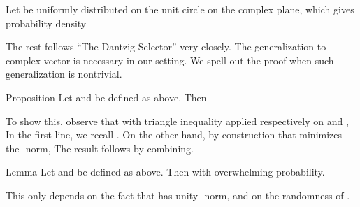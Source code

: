 \stopsection

\startsection [title={Design of \m {\M{F}_R}}]

Let  be uniformly distributed on the unit circle on the complex plane, which gives probability density




\stopsection

\startsection [title={Mean Square Error Analysis for Complex DS}]

The rest follows ``The Dantzig Selector'' very closely.
The generalization to complex vector is necessary in our setting.
We spell out the proof when such generalization is nontrivial.

\Result
{Proposition}
{
Let  and  be defined as above.
Then
}

To show this, observe that with triangle inequality applied respectively on  and ,
In the first line, we recall .
On the other hand, by construction that  minimizes the -norm,
The result follows by combining.

\Result
{Lemma}
{
Let  and  be defined as above.
Then
with overwhelming probability.
}

This only depends on the fact that  has unity -norm, and on the randomness of .

